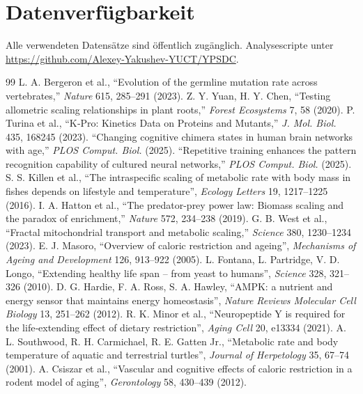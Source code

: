 \documentclass[11pt,a4paper]{article}
\begin{document}
	\section*{Datenverfügbarkeit}
	
	Alle verwendeten Datensätze sind öffentlich zugänglich. Analysescripte unter \url{https://github.com/Alexey-Yakushev-YUCT/YPSDC}.
	
	\begin{thebibliography}{99}
		 L. A. Bergeron et al., ``Evolution of the germline mutation rate across vertebrates,'' \emph{Nature} 615, 285–291 (2023).
		 Z. Y. Yuan, H. Y. Chen, ``Testing allometric scaling relationships in plant roots,'' \emph{Forest Ecosystems} 7, 58 (2020).
		 P. Turina et al., ``K‑Pro: Kinetics Data on Proteins and Mutants,'' \emph{J. Mol. Biol.} 435, 168245 (2023).
		 ``Changing cognitive chimera states in human brain networks with age,'' \emph{PLOS Comput. Biol.} (2025).
		 ``Repetitive training enhances the pattern recognition capability of cultured neural networks,'' \emph{PLOS Comput. Biol.} (2025).
		 S. S. Killen et al., ``The intraspecific scaling of metabolic rate with body mass in fishes depends on lifestyle and temperature'', \emph{Ecology Letters} 19, 1217–1225 (2016).
		 I. A. Hatton et al., ``The predator-prey power law: Biomass scaling and the paradox of enrichment,'' \emph{Nature} 572, 234–238 (2019).
		 G. B. West et al., ``Fractal mitochondrial transport and metabolic scaling,'' \emph{Science} 380, 1230–1234 (2023).
		 E. J. Masoro, ``Overview of caloric restriction and ageing'', \emph{Mechanisms of Ageing and Development} 126, 913–922 (2005).
		 L. Fontana, L. Partridge, V. D. Longo, ``Extending healthy life span – from yeast to humans'', \emph{Science} 328, 321–326 (2010).
		 D. G. Hardie, F. A. Ross, S. A. Hawley, ``AMPK: a nutrient and energy sensor that maintains energy homeostasis'', \emph{Nature Reviews Molecular Cell Biology} 13, 251–262 (2012).
		 R. K. Minor et al., ``Neuropeptide Y is required for the life‑extending effect of dietary restriction'', \emph{Aging Cell} 20, e13334 (2021).
		 A. L. Southwood, R. H. Carmichael, R. E. Gatten Jr., ``Metabolic rate and body temperature of aquatic and terrestrial turtles'', \emph{Journal of Herpetology} 35, 67–74 (2001).
		 A. Csiszar et al., ``Vascular and cognitive effects of caloric restriction in a rodent model of aging'', \emph{Gerontology} 58, 430–439 (2012).

\end{thebibliography}
\end{document}
